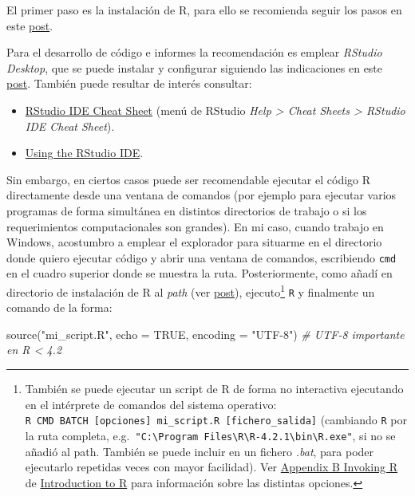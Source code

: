 \documentclass[
]{book}
\newenvironment{Shaded}{\begin{snugshade}}{\end{snugshade}}
\newcommand{\AttributeTok}[1]{\textcolor[rgb]{0.77,0.63,0.00}{#1}}
\newcommand{\CommentTok}[1]{\textcolor[rgb]{0.56,0.35,0.01}{\textit{#1}}}
\newcommand{\ConstantTok}[1]{\textcolor[rgb]{0.00,0.00,0.00}{#1}}
\newcommand{\FunctionTok}[1]{\textcolor[rgb]{0.00,0.00,0.00}{#1}}
\newcommand{\NormalTok}[1]{#1}
\newcommand{\StringTok}[1]{\textcolor[rgb]{0.31,0.60,0.02}{#1}}
\theoremstyle{break}
\theoremstyle{nonumberplain}
\begin{document}
El primer paso es la instalación de R, para ello se recomienda seguir los pasos en este \href{https://rubenfcasal.github.io/post/instalacion-de-r}{post}.

Para el desarrollo de código e informes la recomendación es emplear \emph{RStudio Desktop}, que se puede instalar y configurar siguiendo las indicaciones en este \href{https://rubenfcasal.github.io/post/instalacion-de-rstudio}{post}.
También puede resultar de interés consultar:

\begin{itemize}
\item
  \href{https://posit.co/wp-content/uploads/2022/10/rstudio-ide-1.pdf}{RStudio IDE Cheat Sheet} (menú de RStudio \emph{Help \textgreater{} Cheat Sheets \textgreater{} RStudio IDE Cheat Sheet}).
\item
  \href{https://support.posit.co/hc/en-us/sections/200107586-Using-the-RStudio-IDE}{Using the RStudio IDE}.
\end{itemize}

Sin embargo, en ciertos casos puede ser recomendable ejecutar el código R directamente desde una ventana de comandos (por ejemplo para ejecutar varios programas de forma simultánea en distintos directorios de trabajo o si los requerimientos computacionales son grandes).
En mi caso, cuando trabajo en Windows, acostumbro a emplear el explorador para situarme en el directorio donde quiero ejecutar código y abrir una ventana de comandos, escribiendo \texttt{cmd} en el cuadro superior donde se muestra la ruta.
Posteriormente, como añadí en directorio de instalación de R al \emph{path} (ver \href{https://rubenfcasal.github.io/post/instalacion-de-r/\#rtools}{post}), ejecuto\footnote{También se puede ejecutar un script de R de forma no interactiva ejecutando en el intérprete de comandos del sistema operativo: \texttt{R\ CMD\ BATCH\ {[}opciones{]}\ mi\_script.R\ {[}fichero\_salida{]}} (cambiando \texttt{R} por la ruta completa, e.g.~\texttt{"C:\textbackslash{}Program\ Files\textbackslash{}R\textbackslash{}R-4.2.1\textbackslash{}bin\textbackslash{}R.exe"}, si no se añadió al path. También se puede incluir en un fichero \emph{.bat}, para poder ejecutarlo repetidas veces con mayor facilidad). Ver \href{https://cran.r-project.org/doc/manuals/r-release/R-intro.html\#Invoking-R}{Appendix B Invoking R} de \href{https://cran.r-project.org/doc/manuals/r-release/R-intro.html}{Introduction to R} para información sobre las distintas opciones.} \texttt{R} y finalmente un comando de la forma:

\begin{Shaded}
\begin{Highlighting}[]
\FunctionTok{source}\NormalTok{(}\StringTok{"mi\_script.R"}\NormalTok{, }\AttributeTok{echo =} \ConstantTok{TRUE}\NormalTok{, }\AttributeTok{encoding =} \StringTok{"UTF{-}8"}\NormalTok{) }\CommentTok{\# UTF{-}8 importante en R \textless{} 4.2}
\end{Highlighting}
\end{Shaded}
\end{document}
